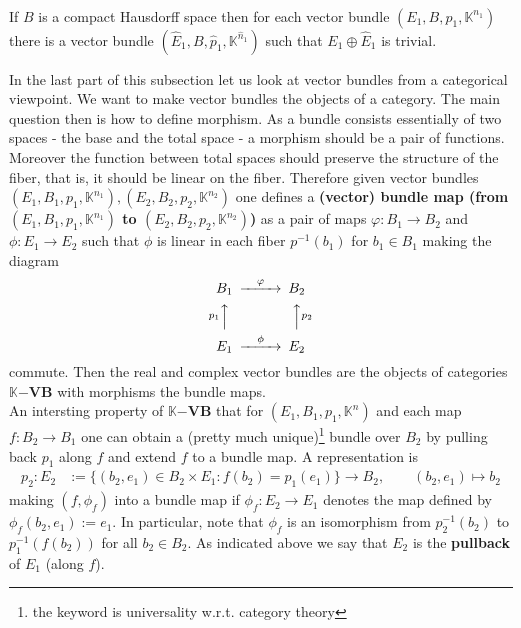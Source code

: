 \\
\begin{prp}
\label{prp:vbtriv}
If $B$ is a compact Hausdorff space then for each vector bundle $(E_{1},B,p_{1},\mathbb{K}^{n_{1}})$ there is a vector bundle $(\hat{E}_{1},B,\hat{p}_{1},\mathbb{K}^{\hat{n}_{1}})$ such that $E_{1} \oplus \hat{E}_{1}$ is trivial.
\end{prp}
In the last part of this subsection let us look at vector bundles from a categorical viewpoint. We want to make vector bundles the objects of a category. The main question then is how to define morphism. As a bundle consists essentially of two spaces - the base and the total space - a morphism should be a pair of functions. Moreover the function between total spaces should preserve the structure of the fiber, that is, it should be linear on the fiber. Therefore given vector bundles $(E_{1},B_{1},p_{1},\mathbb{K}^{n_{1}}),(E_{2},B_{2},p_{2},\mathbb{K}^{n_{2}})$ one defines a \textbf{(vector) bundle map (from $(E_{1},B_{1},p_{1},\mathbb{K}^{n_{1}})$ to $(E_{2},B_{2},p_{2},\mathbb{K}^{n_{2}})$)} as a pair of maps $\varphi \colon B_{1} \to B_{2}$ and $\phi \colon E_{1} \to E_{2}$ such that $\phi$ is linear in each fiber $p^{-1}(b_{1})$ for $b_{1} \in B_{1}$ making the diagram
\begin{align*}
\begin{CD}
  B_{1}
  @>\varphi>>
  B_{2}
  \\
  @Ap_{1}AA
  @AAp_{2}A
  \\
  E_{1}
  @>\phi>>
  E_{2}
\end{CD}
\end{align*}
commute. Then the real and complex vector bundles are the objects of categories $\mathbb{K}\mathbf{-VB}$ with morphisms the bundle maps.
\\
An intersting property of $\mathbb{K}\mathbf{-VB}$ that for $(E_{1},B_{1},p_{1},\mathbb{K}^{n})$ and each map $f \colon B_{2} \to B_{1}$ one can obtain a (pretty much unique)\footnote{the keyword is universality w.r.t. category theory} bundle over $B_{2}$ by {\glqq}pulling back{\grqq} $p_{1}$ along $f$ and extend $f$ to a bundle map. A representation is
\begin{align*}
  p_{2}
  \colon
  E_{2}
  &:=
  \lbrace
      (b_{2},e_{1})
      \in
      B_{2}
      \times
      E_{1}
    \colon
      f(b_{2})
      =
      p_{1}(e_{1})
  \rbrace
  \to
  B_{2}
  ,\qquad
  (b_{2},e_{1})
  \mapsto
  b_{2}
\end{align*}
making $(f,\phi_{f})$ into a bundle map if $\phi_{f} \colon E_{2} \to E_{1}$ denotes the map defined by $\phi_{f}(b_{2},e_{1}) := e_{1}$. In particular, note that $\phi_{f}$ is an isomorphism from $p_{2}^{-1}(b_{2})$ to $p_{1}^{-1}(f(b_{2}))$ for all $b_{2} \in B_{2}$. As indicated above we say that $E_{2}$ is the \textbf{pullback} of $E_{1}$ (along $f$).
